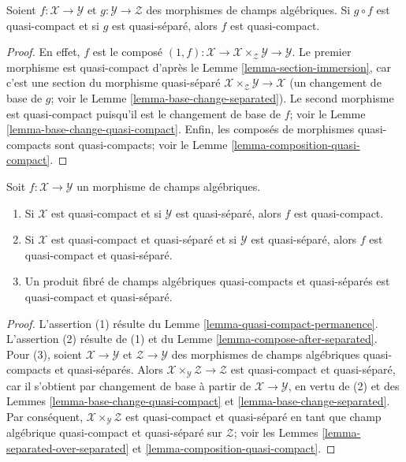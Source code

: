 \begin{lemma}
\label{lemma-quasi-compact-permanence}
Soient $f : \mathcal{X} \to \mathcal{Y}$ et
$g : \mathcal{Y} \to \mathcal{Z}$ des morphismes de champs algébriques.
Si $g \circ f$ est quasi-compact et si $g$ est quasi-séparé,
alors $f$ est quasi-compact.
\end{lemma}

\begin{proof}
En effet, $f$ est le composé
$(1, f) : \mathcal{X} \to \mathcal{X} \times_\mathcal{Z} \mathcal{Y} \to
\mathcal{Y}$. Le premier morphisme est quasi-compact d'après le
Lemme \ref{lemma-section-immersion}, car c'est une section du morphisme
quasi-séparé
$\mathcal{X} \times_\mathcal{Z} \mathcal{Y} \to \mathcal{X}$
(un changement de base de $g$; voir le
Lemme \ref{lemma-base-change-separated}). Le second morphisme est
quasi-compact puisqu'il est le changement de base de $f$; voir le
Lemme \ref{lemma-base-change-quasi-compact}. Enfin, les composés de
morphismes quasi-compacts sont quasi-compacts; voir le
Lemme \ref{lemma-composition-quasi-compact}.
\end{proof}

\begin{lemma}
\label{lemma-quasi-compact-quasi-separated-permanence}
Soit $f : \mathcal{X} \to \mathcal{Y}$ un morphisme de champs algébriques.
\begin{enumerate}
\item Si $\mathcal{X}$ est quasi-compact et si $\mathcal{Y}$ est
quasi-séparé, alors $f$ est quasi-compact.
\item Si $\mathcal{X}$ est quasi-compact et quasi-séparé et si $\mathcal{Y}$
est quasi-séparé, alors $f$ est quasi-compact et quasi-séparé.
\item Un produit fibré de champs algébriques quasi-compacts et quasi-séparés
est quasi-compact et quasi-séparé.
\end{enumerate}
\end{lemma}

\begin{proof}
L'assertion (1) résulte du
Lemme \ref{lemma-quasi-compact-permanence}. L'assertion (2) résulte de (1)
et du Lemme \ref{lemma-compose-after-separated}. Pour (3), soient
$\mathcal{X} \to \mathcal{Y}$ et $\mathcal{Z} \to \mathcal{Y}$ des
morphismes de champs algébriques quasi-compacts et quasi-séparés. Alors
$\mathcal{X} \times_\mathcal{Y} \mathcal{Z} \to \mathcal{Z}$ est
quasi-compact et quasi-séparé, car il s'obtient par changement de base à
partir de $\mathcal{X} \to \mathcal{Y}$, en vertu de (2) et des Lemmes
\ref{lemma-base-change-quasi-compact} et
\ref{lemma-base-change-separated}. Par conséquent,
$\mathcal{X} \times_\mathcal{Y} \mathcal{Z}$ est quasi-compact et
quasi-séparé en tant que champ algébrique quasi-compact et quasi-séparé sur
$\mathcal{Z}$; voir les Lemmes \ref{lemma-separated-over-separated} et
\ref{lemma-composition-quasi-compact}.
\end{proof}


